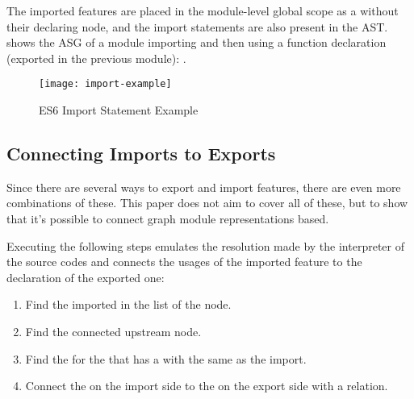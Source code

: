 \begin{figure}[htbp]
	\begin{minipage}{\textwidth}
		
	\end{minipage}
\end{figure}

The imported features are placed in the module-level global scope as a  without their declaring node, and the import statements are also present in the AST.  shows the ASG of a module importing and then using a function declaration (exported in the previous module): .

\begin{figure}[htbp]
  \centering
  \texttt{[image: import-example]}
  \caption{ES6 Import Statement Example}
  \label{fig:es6-import-example}
\end{figure}


\subsection{Connecting Imports to Exports}
Since there are several ways to export and import features, there are even more combinations of these. This paper does not aim to cover all of these, but to show that it's possible to connect graph module representations based.

Executing the following steps emulates the resolution made by the interpreter of the source codes and connects the usages of the imported feature to the declaration of the exported one:

\begin{enumerate}[topsep=0pt]
	\item Find the imported  in the  list of the  node.
	\item Find the connected upstream  node.
	\item Find the  for the  that has a  with the same  as the import.
	\item Connect the  on the import side to the  on the export side with a  relation.
\end{enumerate}

